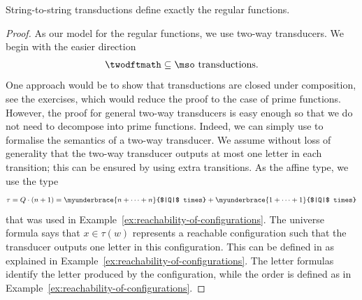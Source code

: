 \begin{theorem}\label{thm:logic-regular-functions}
    String-to-string \mso transductions define exactly the regular functions.
\end{theorem}
\begin{proof} As our model for the regular functions, we use two-way transducers. 
    We begin with the easier direction 
    \begin{align*}
    \twodftmath \subseteq \mso \text{ transductions}.
    \end{align*}
One approach would be to show that \mso transductions are closed under composition, see the exercises, which would reduce the proof to the case of prime functions. However, the proof for general two-way transducers is easy enough so that we do not need to decompose into prime functions. Indeed, we can simply use \mso to formalise the semantics of a two-way transducer. We assume without loss of generality that the two-way transducer outputs at most one letter in each transition; this can be ensured by using extra transitions.  As the affine type, we use the type 
    \begin{align*}
    \tau = Q \cdot (n +1) = 
    \myunderbrace{n + \cdots + n}{$|Q|$ times} + 
    \myunderbrace{1 + \cdots + 1}{$|Q|$ times}
    \end{align*}
    that was used in Example~\ref{ex:reachability-of-configurations}. The universe formula says that $x \in \tau(w)$ represents a reachable configuration such that the transducer outputs one letter in this configuration. This can be defined in \mso as explained in Example~\ref{ex:reachability-of-configurations}. The letter formulas identify the letter produced by the configuration, while the order is defined as in Example~\ref{ex:reachability-of-configurations}.


\end{proof}
